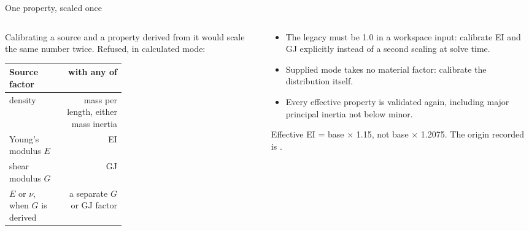 \begin{frame}{One property, scaled once}
\begin{columns}[T]
\begin{column}{0.54\textwidth}
{\small Calibrating a source and a property derived from it would scale the
same number twice. Refused, in calculated mode:\par}
{\ftstablesize\renewcommand{\arraystretch}{1.2}
\begin{tabularx}{\linewidth}{@{}P{0.46\linewidth}R@{}}
\toprule
\textbf{Source factor} & \textbf{with any of} \\
\midrule
density & mass per length, either mass inertia \\
Young's modulus \(E\) & EI \\
shear modulus \(G\) & GJ \\
\(E\) or \(\nu\), when \(G\) is derived & a separate \(G\) or GJ factor \\
\bottomrule
\end{tabularx}}
\par\vspace{1.5mm}
{\scriptsize {}\par}
\end{column}
\begin{column}{0.42\textwidth}
\begin{itemize}\scriptsize
  \item The legacy  must be 1.0 in a
        workspace input: calibrate EI and GJ explicitly instead of a second
        scaling at solve time.
  \item Supplied mode takes no material factor: calibrate the distribution
        itself.
  \item Every effective property is validated again, including major
        principal inertia not below minor.
\end{itemize}
\begin{ftsevidence}
\scriptsize Effective EI = base \(\times\) 1.15, not base \(\times\) 1.2075.
The origin recorded is .
\end{ftsevidence}
\end{column}
\end{columns}
\end{frame}

